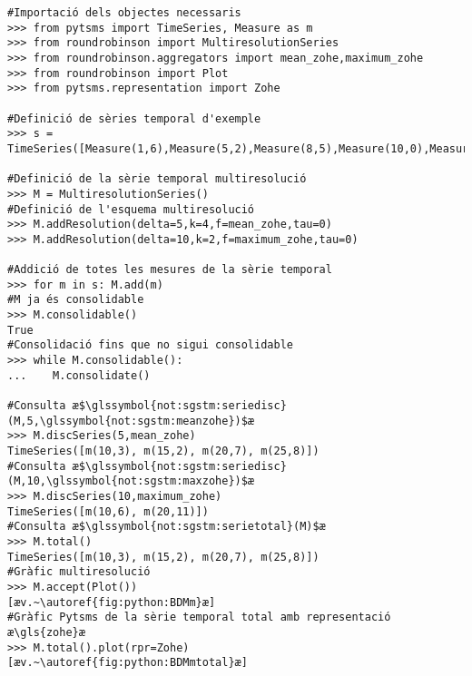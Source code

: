 \begin{lstlisting}[style=py,caption=Exemple d'operacions amb RoundRobinson,label=lst:roundrobinson:ex1]
#Importació dels objectes necessaris
>>> from pytsms import TimeSeries, Measure as m
>>> from roundrobinson import MultiresolutionSeries
>>> from roundrobinson.aggregators import mean_zohe,maximum_zohe
>>> from roundrobinson import Plot
>>> from pytsms.representation import Zohe

#Definició de sèries temporal d'exemple
>>> s = TimeSeries([Measure(1,6),Measure(5,2),Measure(8,5),Measure(10,0),Measure(14,1),Measure(19,6),Measure(22,11),Measure(26,6),Measure(29,0)])

#Definició de la sèrie temporal multiresolució
>>> M = MultiresolutionSeries()
#Definició de l'esquema multiresolució
>>> M.addResolution(delta=5,k=4,f=mean_zohe,tau=0)
>>> M.addResolution(delta=10,k=2,f=maximum_zohe,tau=0)

#Addició de totes les mesures de la sèrie temporal
>>> for m in s: M.add(m)
#M ja és consolidable
>>> M.consolidable()
True
#Consolidació fins que no sigui consolidable
>>> while M.consolidable(): 
...    M.consolidate()

#Consulta æ$\glssymbol{not:sgstm:seriedisc}(M,5,\glssymbol{not:sgstm:meanzohe})$æ
>>> M.discSeries(5,mean_zohe)
TimeSeries([m(10,3), m(15,2), m(20,7), m(25,8)])
#Consulta æ$\glssymbol{not:sgstm:seriedisc}(M,10,\glssymbol{not:sgstm:maxzohe})$æ
>>> M.discSeries(10,maximum_zohe)
TimeSeries([m(10,6), m(20,11)])
#Consulta æ$\glssymbol{not:sgstm:serietotal}(M)$æ
>>> M.total()
TimeSeries([m(10,3), m(15,2), m(20,7), m(25,8)])
#Gràfic multiresolució
>>> M.accept(Plot())
[æv.~\autoref{fig:python:BDMm}æ]
#Gràfic Pytsms de la sèrie temporal total amb representació æ\gls{zohe}æ
>>> M.total().plot(rpr=Zohe)
[æv.~\autoref{fig:python:BDMmtotal}æ]
\end{lstlisting}



